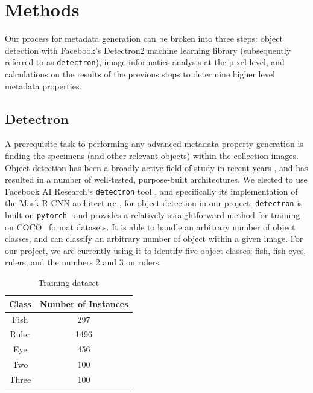 \documentclass[screen,review]{acmart}
\begin{document}
\section{Methods}
Our process for metadata generation can be broken into three steps: object detection with Facebook's Detectron2 machine learning library (subsequently referred to as \verb|detectron|), image informatics analysis at the pixel level, and calculations on the results of the previous steps to determine higher level metadata properties.

\subsection{Detectron}
A prerequisite task to performing any advanced metadata property generation
is finding the specimens (and other relevant objects) within the collection
images. Object detection has been a broadly active field of study in recent
years \cite{zou2019object}, and has resulted in a number of well-tested, purpose-built architectures. We elected to use Facebook AI Research's \verb|detectron| tool \cite{wu2019detectron2}, and specifically its implementation of the Mask R-CNN architecture \cite{he2018mask}, for object detection in our project.
\verb|detectron| is built on \verb|pytorch|~\cite{NEURIPS2019_9015} and provides a relatively straightforward method for training on COCO~\cite{DBLP:journals/corr/LinMBHPRDZ14} format datasets. It is able to handle an arbitrary number of object classes, and can classify an arbitrary number of object within a given image. For our project, we are currently using it to identify five object classes: fish, fish eyes, rulers, and the numbers 2 and 3 on rulers.

\begin{table}
    \centering
      \caption{Training dataset}
    \label{tab:dataset}
    \begin{tabular}{cc}
        \toprule
        \textbf{Class} & \textbf{Number of Instances}\\
        \midrule
        Fish & 297\\
        Ruler & 1496\\
        Eye & 456\\
        Two & 100\\
        Three & 100\\
      \bottomrule
    \end{tabular}
\end{table}
\end{document}
